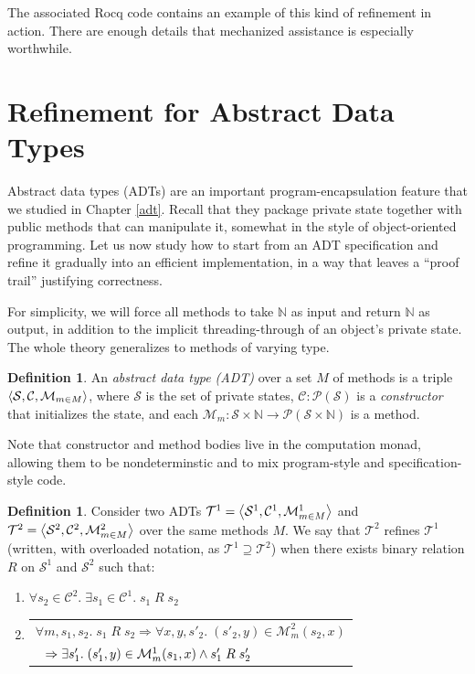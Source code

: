 \documentclass{amsbook}
\theoremstyle{definition}
\newtheorem{definition}[theorem]{Definition}
\theoremstyle{remark}
\numberwithin{section}{chapter}
\numberwithin{equation}{chapter}
\begin{document}
The associated Rocq code contains an example of this kind of refinement in action.
There are enough details that mechanized assistance is especially worthwhile.

\section{Refinement for Abstract Data Types}

Abstract data types (ADTs) are an important program-encapsulation feature that we studied in Chapter \ref{adt}.
Recall that they package private state together with public methods that can manipulate it, somewhat in the style of object-oriented programming.
Let us now study how to start from an ADT specification and refine it gradually into an efficient implementation, in a way that leaves a ``proof trail'' justifying correctness.

For simplicity, we will force all methods to take $\mathbb N$ as input and return $\mathbb N$ as output, in addition to the implicit threading-through of an object's private state.
The whole theory generalizes to methods of varying type.

\begin{definition}
  An \emph{abstract data type (ADT)} over a set $M$ of methods is a triple ${\left \langle \mathcal S, \mathcal C, \mathcal M_{m \in M} \right \rangle}$, where $\mathcal S$ is the set of private states, $\mathcal C : \mathcal P(\mathcal S)$ is a \emph{constructor} that initializes the state, and each $\mathcal M_m : \mathcal S \times \mathbb N \to \mathcal P(\mathcal S \times \mathbb N)$ is a method.
\end{definition}

Note that constructor and method bodies live in the computation monad, allowing them to be nondeterminstic and to mix program-style and specification-style code.

\begin{definition}
  Consider two ADTs $\mathcal T^1 = {\left \langle \mathcal S^1, \mathcal C^1, \mathcal M^1_{m \in M} \right \rangle}$ and $\mathcal T^2 = {\left \langle \mathcal S^2, \mathcal C^2, \mathcal M^2_{m \in M} \right \rangle}$ over the same methods $M$.
  We say that $\mathcal T^2$ refines $\mathcal T^1$ (written, with overloaded notation, as $\mathcal T^1 \supseteq \mathcal T^2$) when there exists binary relation $R$ on $\mathcal S^1$ and $\mathcal S^2$ such that:
  \begin{enumerate}
  \item $\forall s_2 \in \mathcal C^2. \; \exists s_1 \in \mathcal C^1. \; s_1 \; R \; s_2$
  \item \begin{tabular}{l}
    $\forall m, s_1, s_2. \; s_1 \; R \; s_2 \Rightarrow \forall x, y, s'_2. \; (s'_2, y) \in \mathcal M^2_m(s_2, x)$ \\
    $\hspace{.1in} \Rightarrow \exists s'_1. \; (s'_1, y) \in \mathcal M^1_m(s_1, x) \land s'_1 \; R \; s'_2$
  \end{tabular}
  \end{enumerate}
\end{definition}
\end{document}
